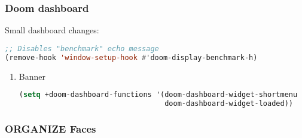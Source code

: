 \documentclass[11pt]{article}
\begin{document}
\subsubsection{Doom dashboard}
\label{sec:doom-dashboard}
Small dashboard changes:

\begin{lstlisting}[language=Lisp]
;; Disables "benchmark" echo message
(remove-hook 'window-setup-hook #'doom-display-benchmark-h)
\end{lstlisting}

\begin{enumerate}
  \item Banner
  \label{sec:banner}

  \begin{lstlisting}[language=Lisp]
(setq +doom-dashboard-functions '(doom-dashboard-widget-shortmenu
                                  doom-dashboard-widget-loaded))
\end{lstlisting}
\end{enumerate}

\subsubsection{ORGANIZE Faces}
\label{sec:organize-faces}
\end{document}
